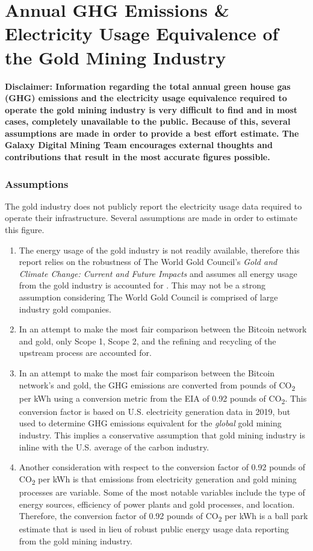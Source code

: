 \section{Annual GHG Emissions \& Electricity Usage Equivalence of the Gold Mining Industry}\label{section:gold}
\textbf{Disclaimer: Information regarding the total annual green house gas (GHG) emissions and the electricity usage equivalence required to operate the gold mining industry is very difficult to find and in most cases, completely unavailable to the public.
Because of this, several assumptions are made in order to provide a best effort estimate.
The Galaxy Digital Mining Team encourages external thoughts and contributions that result in the most accurate figures possible.} \\

\subsubsection{Assumptions}
The gold industry does not publicly report the electricity usage data required to operate their infrastructure.
Several assumptions are made in order to estimate this figure. 

\begin{enumerate}
  \item The energy usage of the gold industry is not readily available, therefore this report relies on the robustness of The World Gold Council's \textit{Gold and Climate Change: Current and Future Impacts} and assumes all energy usage from the gold industry is accounted for \cite{gold-report}.
    This may not be a strong assumption considering The World Gold Council is comprised of large industry gold companies.
  \item In an attempt to make the most fair comparison between the Bitcoin network and gold, only Scope 1, Scope 2, and the refining and recycling of the upstream process are accounted for.
  \item In an attempt to make the most fair comparison between the Bitcoin network's and gold, the GHG emissions are converted from pounds of CO\textsubscript{2} per kWh using a conversion metric from the EIA of 0.92 pounds of CO\textsubscript{2}. 
    This conversion factor is based on U.S. electricity generation data in 2019, but used to determine GHG emissions equivalent for the \textit{global} gold mining industry.
    This implies a conservative assumption that gold mining industry is inline with the U.S. average of the carbon industry.
  \item Another consideration with respect to the conversion factor of 0.92 pounds of CO\textsubscript{2} per kWh is that emissions from electricity generation and gold mining processes are variable. 
    Some of the most notable variables include the type of energy sources, efficiency of power plants and gold processes, and location.
    Therefore, the conversion factor of 0.92 pounds of CO\textsubscript{2} per kWh is a ball park estimate that is used in lieu of robust public energy usage data reporting from the gold mining industry.
\end{enumerate}

